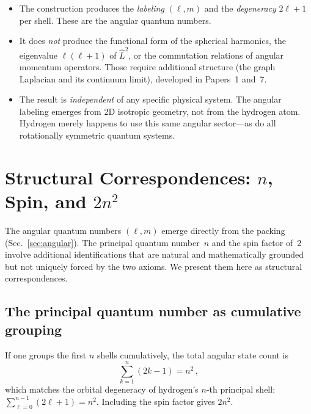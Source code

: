 \documentclass[aps,prl,reprint,amsmath,amssymb]{revtex4-2}
\begin{document}
\begin{itemize}
\item The construction produces the \emph{labeling} $(\ell, m)$ and
  the \emph{degeneracy} $2\ell + 1$ per shell.  These are the angular
  quantum numbers.

\item It does \emph{not} produce the functional form of the spherical
  harmonics, the eigenvalue $\ell(\ell+1)$ of $\hat{L}^2$, or the
  commutation relations of angular momentum operators.  Those require
  additional structure (the graph Laplacian and its continuum limit),
  developed in Papers~1 and~7.

\item The result is \emph{independent} of any specific physical
  system.  The angular labeling emerges from 2D isotropic geometry,
  not from the hydrogen atom.  Hydrogen merely happens to use this
  same angular sector---as do all rotationally symmetric quantum
  systems.
\end{itemize}


\section{Structural Correspondences: $n$, Spin, and $2n^2$}
\label{sec:correspondences}

The angular quantum numbers $(\ell, m)$ emerge directly from the
packing (Sec.~\ref{sec:angular}).  The principal quantum number~$n$
and the spin factor of~2 involve additional identifications that are
natural and mathematically grounded but not uniquely forced by the two
axioms.  We present them here as structural correspondences.

\subsection{The principal quantum number as cumulative grouping}

If one groups the first $n$ shells cumulatively, the total angular
state count is
\begin{equation}
  \sum_{k=1}^{n} (2k - 1) = n^2 \,,
  \label{eq:n-squared}
\end{equation}
which matches the orbital degeneracy of hydrogen's $n$-th principal
shell: $\sum_{\ell=0}^{n-1}(2\ell+1) = n^2$.  Including the spin
factor gives $2n^2$.
\end{document}
